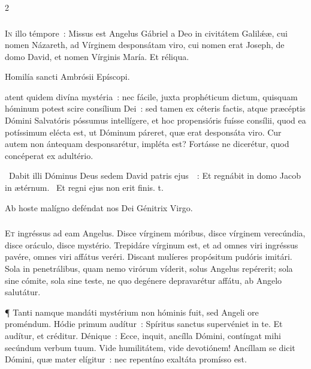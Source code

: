 \documentclass[9pt,twoside]{extarticle}
\begin{document}
\begin{multicols}{2}
{\subsubsection*{\center {}}
\lettrine{I}n illo témpore~: Missus est Angelus Gábriel a Deo in civitátem Galilǽæ, cui nomen Názareth, ad Vírginem desponsátam viro, cui nomen erat Joseph, de domo David, et nomen Vírginis María. Et réliqua.

\begin{center}Homilía sancti Ambrósii Epíscopi.\\
\end{center}
atent quidem divína mystéria~: nec fácile, juxta prophéticum dictum, quisquam hóminum potest scire consílium Dei~: sed tamen ex céteris factis, atque præcéptis Dómini Salvatóris póssumus intellígere, et hoc propensióris fuísse consílii, quod ea potíssimum elécta est, ut Dóminum páreret, quæ erat desponsáta viro. Cur autem non ántequam desponsarétur, impléta est? Fortásse ne dicerétur, quod concéperat ex adultério.

\begin{tightlist}{}
\item {}~Dabit illi Dóminus Deus sedem David patris ejus~~: \textred{*} Et regnábit in domo Jacob in ætérnum. ~Et regni ejus non erit finis. t.
\item {\small {} Ab hoste malígno deféndat nos Dei Génitrix Virgo.}
\item {}
\end{tightlist}

\subsubsection*{\center {}}
\lettrine{E}t ingréssus ad eam Angelus. Disce vírginem móribus, disce vírginem verecúndia, disce oráculo, disce mystério. Trepidáre vírginum est, et ad omnes viri ingréssus pavére, omnes viri affátus veréri. Discant mulíeres propósitum pudóris imitári. Sola in penetrálibus, quam nemo virórum víderit, solus Angelus repérerit; sola sine cómite, sola sine teste, ne quo degénere depravarétur affátu, ab Angelo salutátur.

¶ Tanti namque mandáti mystérium non hóminis fuit, sed Angeli ore proméndum. Hódie primum audítur~: Spíritus sanctus supervéniet in te. Et audítur, et créditur. Dénique~: Ecce, inquit, ancílla Dómini, contíngat mihi secúndum verbum tuum. Vide humilitátem, vide devotiónem! Ancíllam se dicit Dómini, quæ mater elígitur~: nec repentíno exaltáta promísso est.

}
\end{multicols}
\end{document}
